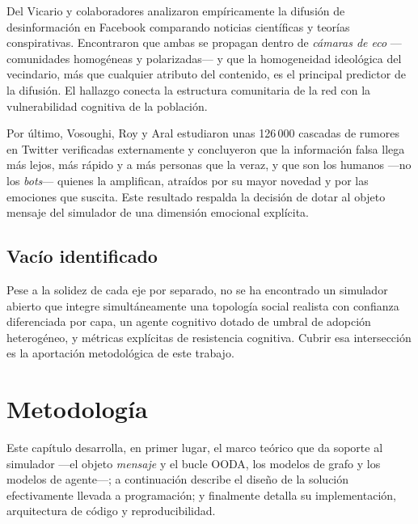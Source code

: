 \documentclass[12pt]{extarticle}
\numberwithin{equation}{section}
\begin{document}
\begin{refsection}
Del Vicario y colaboradores \cite{DelVicario2016} analizaron emp\'iricamente la difusi\'on de desinformaci\'on en Facebook comparando noticias cient\'ificas y teor\'ias conspirativas. Encontraron que ambas se propagan dentro de \emph{c\'amaras de eco} —comunidades homog\'eneas y polarizadas— y que la homogeneidad ideol\'ogica del vecindario, m\'as que cualquier atributo del contenido, es el principal predictor de la difusi\'on. El hallazgo conecta la estructura comunitaria de la red con la vulnerabilidad cognitiva de la poblaci\'on.

Por \'ultimo, Vosoughi, Roy y Aral \cite{Vosoughi2018} estudiaron unas 126\,000 cascadas de rumores en Twitter verificadas externamente y concluyeron que la informaci\'on falsa llega m\'as lejos, m\'as r\'apido y a m\'as personas que la veraz, y que son los humanos —no los \emph{bots}— quienes la amplifican, atra\'idos por su mayor novedad y por las emociones que suscita. Este resultado respalda la decisi\'on de dotar al objeto mensaje del simulador de una dimensi\'on emocional expl\'icita.

\subsection{Vac\'io identificado}

Pese a la solidez de cada eje por separado, no se ha encontrado un simulador abierto que integre simult\'aneamente una topolog\'ia social realista con confianza diferenciada por capa, un agente cognitivo dotado de umbral de adopci\'on heterog\'eneo, y m\'etricas expl\'icitas de resistencia cognitiva. Cubrir esa intersecci\'on es la aportaci\'on metodol\'ogica de este trabajo.

\newpage


\section{Metodolog\'ia}\label{sec:methodology}

Este cap\'itulo desarrolla, en primer lugar, el marco te\'orico que da soporte al simulador —el objeto \emph{mensaje} y el bucle OODA, los modelos de grafo y los modelos de agente—; a continuaci\'on describe el dise\~no de la soluci\'on efectivamente llevada a programaci\'on; y finalmente detalla su implementaci\'on, arquitectura de c\'odigo y reproducibilidad.


\end{refsection}
\end{document}
